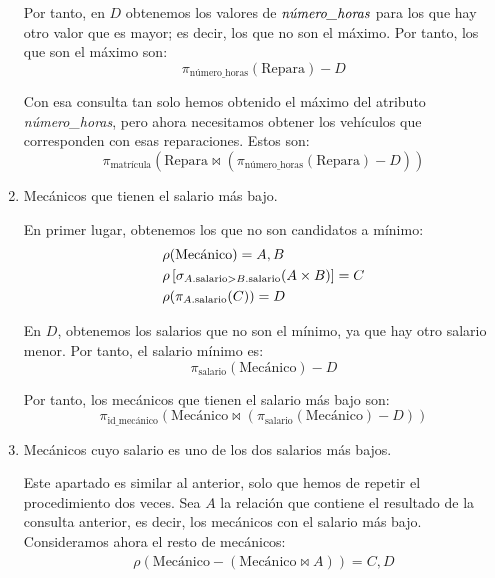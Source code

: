 \begin{ejercicio}
\begin{enumerate}
        Por tanto, en $D$ obtenemos los valores de $\emph{número\_horas}$ para los que hay otro valor que es mayor; es decir,
        los que no son el máximo. Por tanto, los que son el máximo son:
        \begin{equation*}
            \pi_{\text{número\_horas}}(\text{Repara})-D
        \end{equation*}

        Con esa consulta tan solo hemos obtenido el máximo del atributo \emph{número\_horas}, pero ahora necesitamos obtener los vehículos
        que corresponden con esas reparaciones. Estos son:
        \begin{equation*}
            \pi_{\text{matrícula}}(\text{Repara}\bowtie (\pi_{\text{número\_horas}}(\text{Repara})-D))
        \end{equation*}
        \item Mecánicos que tienen el salario más bajo.
        
        En primer lugar, obtenemos los que no son candidatos a mínimo:
        \begin{align*}
            & \rho(\text{Mecánico}) = A,B\\
            & \rho\left[\sigma_{A.\text{salario} > B.\text{salario}}(A \times B)\right] = C\\
            & \rho(\pi_{A.\text{\text{salario}}}(C)) = D
        \end{align*}

        En $D$, obtenemos los salarios que no son el mínimo, ya que hay otro salario menor.
        Por tanto, el salario mínimo es:
        \begin{equation*}
            \pi_{\text{salario}}(\text{Mecánico})-D
        \end{equation*}

        Por tanto, los mecánicos que tienen el salario más bajo son:
        \begin{equation*}
            \pi_{\text{id\_mecánico}}(\text{Mecánico}\bowtie (\pi_{\text{salario}}(\text{Mecánico})-D))
        \end{equation*}
        \item Mecánicos cuyo salario es uno de los dos salarios más bajos.
        
        Este apartado es similar al anterior, solo que hemos de repetir el procedimiento dos veces.
        Sea $A$ la relación que contiene el resultado de la consulta anterior, es decir, los mecánicos con el salario más bajo.
        Consideramos ahora el resto de mecánicos:
        \begin{align*}
            \rho(\text{Mecánico}-(\text{Mecánico}\bowtie A)) = C,D
        \end{align*}


\end{enumerate}
\end{ejercicio}

